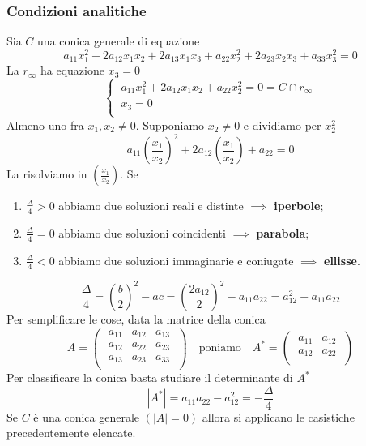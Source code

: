 \documentclass[twoside]{report}
\begin{document}
\subsubsection{Condizioni analitiche}
Sia \(C\) una conica generale di equazione \[
a_{11}x_1^2+ 2a_{12}x_1x_2+2a_{13}x_1x_3+a_{22}x_2^2+2a_{23}x_2x_3+a_{33}x_3^2=0
\] 
La \(r_{\infty}\) ha equazione \(x_{3}=0\) \[
\begin{cases}
    \ a_{11}x_1^2+2a_{12}x_1x_2+a_{22}x_2^2= 0 = C \cap r_{\infty} \\
    \ x_3 = 0 \\
\end{cases}
\]
Almeno uno fra \(x_1, x_2 \neq 0\). Supponiamo \(x_2 \neq 0\) e dividiamo per \(x_2^2\) \[
a_{11} \left( \frac{x_1}{x_2} \right) ^2 + 2a_{12} \left( \frac{x_1}{x_2} \right)  + a_{22} = 0
\] 
La risolviamo in \(\left( \frac{x_1}{x_2} \right) \). Se 
\begin{enumerate}
    \item \(\frac{\Delta}{4} > 0\) abbiamo due soluzioni reali e distinte \(\implies \) \textbf{iperbole};
    \item \(\frac{\Delta}{4} = 0\) abbiamo due soluzioni coincidenti \(\implies \) \textbf{parabola};
    \item \(\frac{\Delta}{4} < 0\) abbiamo due soluzioni immaginarie e coniugate \(\implies \) \textbf{ellisse}.
\end{enumerate}

\[
\frac{\Delta}{4} = \left( \frac{b}{2} \right) ^2 - ac = \left( \frac{2a_{12}}{2} \right) ^2 - a_{11} a_{22} = a_{12}^2 - a_{11} a_{22}
\]Per semplificare le cose, data la matrice della conica \[
A = 
\left( \; \begin{matrix}
    a_{11} & a_{12} & a_{13} \\
    a_{12} & a_{22} & a_{23} \\
    a_{13} & a_{23} & a_{33} \\
\end{matrix} \; \right)
\quad \text{poniamo} \quad A^* =
\left( \; \begin{matrix}
    a_{11} & a_{12} \\
    a_{12} & a_{22} \\
\end{matrix} \; \right) \]
Per classificare la conica basta studiare il determinante di \(A^{*}\)
\[
|A^{*}| = a_{11}a_{22}-a_{12}^2= - \frac{\Delta}{4}
\] Se \(C\) è una conica generale \((|A| = 0)\) allora si applicano le casistiche precedentemente elencate.
\end{document}
